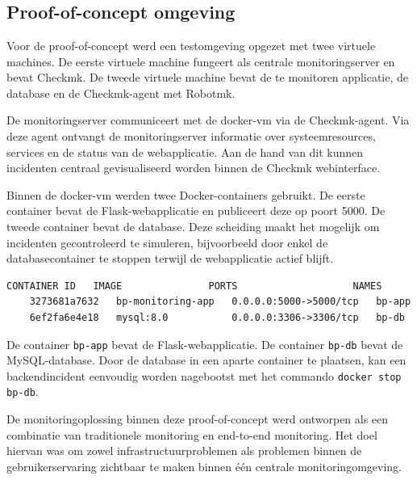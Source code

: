 \chapter{}
\label{ch:proof-of-concept}

\section{Proof-of-concept omgeving}


Voor de proof-of-concept werd een testomgeving opgezet met twee virtuele machines. De eerste virtuele machine fungeert als centrale monitoringserver en bevat Checkmk. De tweede virtuele machine bevat de te monitoren applicatie, de database en de Checkmk-agent met Robotmk.

De monitoringserver communiceert met de docker-vm via de Checkmk-agent. Via deze agent ontvangt de monitoringserver informatie over systeemresources, services en de status van de webapplicatie. Aan de hand van dit kunnen incidenten centraal gevisualiseerd worden binnen de Checkmk webinterface.

Binnen de docker-vm werden twee Docker-containers gebruikt. De eerste container bevat de Flask-webapplicatie en publiceert deze op poort 5000. De tweede container bevat de database. Deze scheiding maakt het mogelijk om incidenten gecontroleerd te simuleren, bijvoorbeeld door enkel de databasecontainer te stoppen terwijl de webapplicatie actief blijft.

\begin{lstlisting}[caption={Docker-containers binnen de proof-of-concept}]
    CONTAINER ID   IMAGE               PORTS                    NAMES
    3273681a7632   bp-monitoring-app   0.0.0.0:5000->5000/tcp   bp-app
    6ef2fa6e4e18   mysql:8.0           0.0.0.0:3306->3306/tcp   bp-db
\end{lstlisting}

De container \texttt{bp-app} bevat de Flask-webapplicatie. De container \texttt{bp-db} bevat de MySQL-database. Door de database in een aparte container te plaatsen, kan een backendincident eenvoudig worden nagebootst met het commando \texttt{docker stop bp-db}.


De monitoringoplossing binnen deze proof-of-concept werd ontworpen als een combinatie van traditionele monitoring en end-to-end monitoring. Het doel hiervan was om zowel infrastructuurproblemen als problemen binnen de gebruikerservaring zichtbaar te maken binnen één centrale monitoringomgeving.

